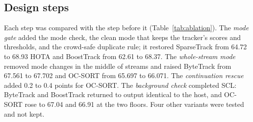 \documentclass[pdflatex,sn-mathphys-num,iicol]{sn-jnl}
\newcommand{\scl}{SCL}
\begin{document}
\subsection{Design steps}\label{sec:steps}
Each step was compared with the step before it (Table~\ref{tab:ablation}). The \emph{mode gate}
added the mode check, the clean mode that keeps the tracker's scores and thresholds, and the crowd-safe duplicate
rule; it restored SparseTrack from 64.72 to 68.93 HOTA and BoostTrack from 62.61 to 68.37. The
\emph{whole-stream mode} removed mode changes in the middle of streams and raised ByteTrack from
67.561 to 67.702 and OC-SORT from 65.697 to 66.071. The \emph{continuation rescue} added 0.2 to 0.4
points for OC-SORT. The \emph{background check} completed \scl{}: ByteTrack and BoostTrack returned
to output identical to the host, and OC-SORT rose to 67.04 and 66.91 at the two floors. Four other
variants were tested and not kept.
\end{document}

